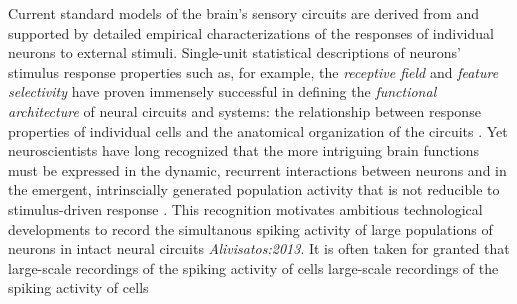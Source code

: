 Current standard models of the brain's sensory circuits are derived from and supported by detailed empirical characterizations of the responses of individual neurons to external stimuli.
Single-unit statistical descriptions of neurons' stimulus response properties such as, for example, the \emph{receptive field} and \emph{feature selectivity} have proven immensely successful in defining the \emph{functional architecture} of neural circuits and systems: the relationship between response properties of individual cells and the anatomical organization of the circuits  \citep{Ohki:2005,Reid:2012}.
Yet neuroscientists have long recognized that the more intriguing brain functions must be expressed in the dynamic, recurrent interactions between neurons and in the emergent, intrinscially generated population activity that is not reducible to stimulus-driven response \citep{Yuste:2005}.
This recognition motivates ambitious technological developments to record the simultanous spiking activity of large populations of neurons in intact neural circuits \emph{Alivisatos:2013}. 
It is often taken for granted that large-scale recordings of the spiking activity of cells large-scale recordings of the spiking activity of cells 
